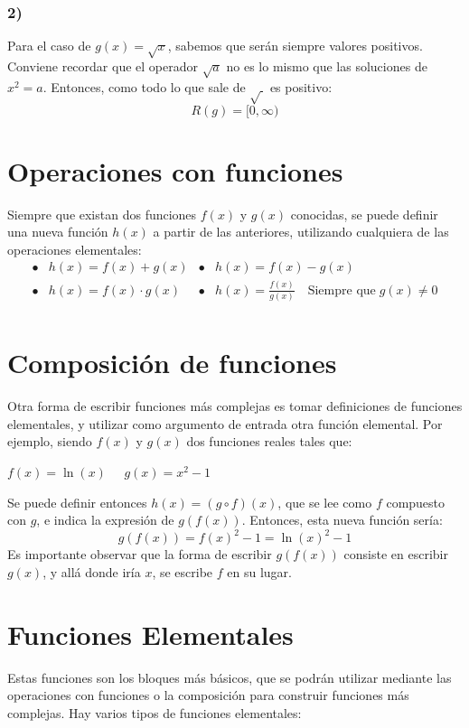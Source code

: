 \documentclass[sans]{apuntes}
\begin{document}
\begin{examplebox}
	\subsubsection*{2)}
	Para el caso de $g(x) = \sqrt{x}$, sabemos que serán siempre valores positivos. Conviene recordar que el operador $\sqrt{a}$ no es lo mismo que las soluciones de $x^2 = a$. Entonces, como todo lo que sale de $\sqrt{\ }$ es positivo:
	\[ R(g) = [0, \infty) \]
\end{examplebox}

\section{Operaciones con funciones} %
Siempre que existan dos funciones $f(x)$ y $g(x)$ conocidas, se puede definir una nueva función $h(x)$ a partir de las anteriores, utilizando cualquiera de las operaciones elementales:
\renewcommand{\arraystretch}{1.5}
\[
	\begin{array}{clcl}
		\bullet & h(x) = f(x) + g(x)     & \bullet & h(x) = f(x) - g(x)                                            \\
		\bullet & h(x) = f(x) \cdot g(x) & \bullet & h(x) = \frac{f(x)}{g(x)}\quad\text{Siempre que}\; g(x) \neq 0 \\
	\end{array}
\]

\section{Composición de funciones}
Otra forma de escribir funciones más complejas es tomar definiciones de funciones elementales, y utilizar como argumento de entrada otra función elemental. Por ejemplo, siendo $f(x)$ y $g(x)$ dos funciones reales tales que:
\par \(f(x) = \ln(x)\;\;\;\;\;g(x) = x^2 - 1\)
\par Se puede definir entonces \(h(x) = (g \circ f) (x)\), que se lee como $f$ compuesto con $g$, e indica la expresión de $g(f(x))$. Entonces, esta nueva función sería:
\[g(f(x)) = f(x)^2 - 1 = {\ln(x)}^2 - 1\]
Es importante observar que la forma de escribir $g(f(x))$ consiste en escribir $g(x)$, y allá donde iría $x$, se escribe $f$ en su lugar.

\section{Funciones Elementales}
Estas funciones son los bloques más básicos, que se podrán utilizar mediante las operaciones con funciones o la composición para construir funciones más complejas. Hay varios tipos de funciones elementales:
\end{document}
